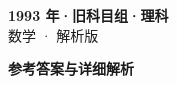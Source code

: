 \documentclass[zihao=-4, a4paper]{ctexart}
\begin{document}
\begin{center}
  {\Large\bfseries 1993 年·旧科目组·理科}\\[4pt]
  {\large 数学 · 解析版}
\end{center}
\medskip
{}

\clearpage
{}
\begin{center}{\Large\bfseries 参考答案与详细解析}\end{center}
\medskip

\end{document}

